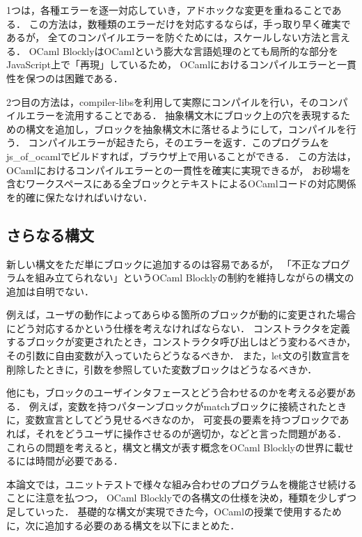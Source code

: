 1つは，各種エラーを逐一対応していき，アドホックな変更を重ねることである．
この方法は，数種類のエラーだけを対応するならば，手っ取り早く確実であるが，
全てのコンパイルエラーを防ぐためには，スケールしない方法と言える．
OCaml BlocklyはOCamlという膨大な言語処理のとても局所的な部分をJavaScript上で「再現」しているため，
OCamlにおけるコンパイルエラーと一貫性を保つのは困難である．

2つ目の方法は，compiler-libsを利用して実際にコンパイルを行い，そのコンパイルエラーを流用することである．
抽象構文木にブロック上の穴を表現するための構文を追加し，ブロックを抽象構文木に落せるようにして，コンパイルを行う．
コンパイルエラーが起きたら，そのエラーを返す．このプログラムをjs\_of\_ocamlでビルドすれば，ブラウザ上で用いることができる．
この方法は，OCamlにおけるコンパイルエラーとの一貫性を確実に実現できるが，
お砂場を含むワークスペースにある全ブロックとテキストによるOCamlコードの対応関係を的確に保たなければいけない．

\subsection*{さらなる構文}

新しい構文をただ単にブロックに追加するのは容易であるが，
「不正なプログラムを組み立てられない」というOCaml Blocklyの制約を維持しながらの構文の追加は自明でない．

例えば，ユーザの動作によってあらゆる箇所のブロックが動的に変更された場合にどう対応するかという仕様を考えなければならない．
コンストラクタを定義するブロックが変更されたとき，コンストラクタ呼び出しはどう変わるべきか，
その引数に自由変数が入っていたらどうなるべきか．%
また，let文の引数宣言を削除したときに，引数を参照していた変数ブロックはどうなるべきか．

他にも，ブロックのユーザインタフェースとどう合わせるのかを考える必要がある．
例えば，変数を持つパターンブロックがmatchブロックに接続されたときに，変数宣言としてどう見せるべきなのか，
可変長の要素を持つブロックであれば，それをどうユーザに操作させるのが適切か，などと言った問題がある．
これらの問題を考えると，構文と構文が表す概念をOCaml Blocklyの世界に載せるには時間が必要である．

本論文では，ユニットテストで様々な組み合わせのプログラムを機能させ続けることに注意を払つつ，
OCaml Blocklyでの各構文の仕様を決め，種類を少しずつ足していった．
基礎的な構文が実現できた今，OCamlの授業で使用するために，次に追加する必要のある構文を以下にまとめた．

